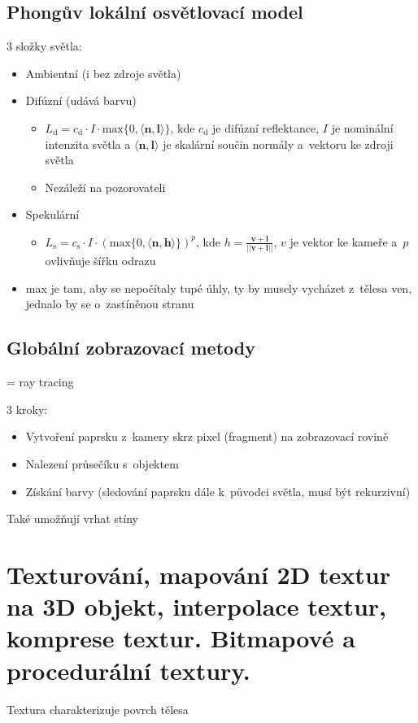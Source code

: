 \subsection{Phongův lokální osvětlovací model}

3 složky světla:
\begin{itemize}
    \item Ambientní (i bez zdroje světla)
    \item Difúzní (udává barvu)
    \begin{itemize}
        \item \(L_\mathrm{d}=c_\mathrm{d}\cdot I\cdot\mathrm{max}\{0,\langle \mathbf{n}, \mathbf{l}\rangle \}\), kde \(c_\mathrm{d}\) je difúzní reflektance, \(I\) je nominální intenzita světla a \(\langle\mathbf{n}, \mathbf{l}\rangle\) je skalární součin normály a~vektoru ke zdroji světla
        \item Nezáleží na pozorovateli
    \end{itemize}
    \item Spekulární
    \begin{itemize}
        \item \(L_\mathrm{s}=c_\mathrm{s}\cdot I\cdot(\mathrm{max}\{0,\langle \mathbf{n}, \mathbf{h}\rangle \})^p\), kde \(h=\frac{\mathbf{v}+\mathbf{l}}{||\mathbf{v}+\mathbf{l}||}\), \(v\) je vektor ke kameře a~\(p\) ovlivňuje šířku odrazu
    \end{itemize}
    \item max je tam, aby se nepočítaly tupé úhly, ty by musely vycházet z~tělesa ven, jednalo by se o~zastíněnou stranu
\end{itemize}

\subsection{Globální zobrazovací metody}
= ray tracing

3 kroky:
\begin{itemize}
    \item Vytvoření paprsku z~kamery skrz pixel (fragment) na zobrazovací rovině
    \item Nalezení průsečíku s~objektem
    \item Získání barvy (sledování paprsku dále k~původci světla, musí být rekurzivní)
\end{itemize}

Také umožňují vrhat stíny


\section{Texturování, mapování 2D textur na 3D objekt, interpolace textur, komprese textur. Bitmapové a procedurální textury.}
Textura charakterizuje povrch tělesa

